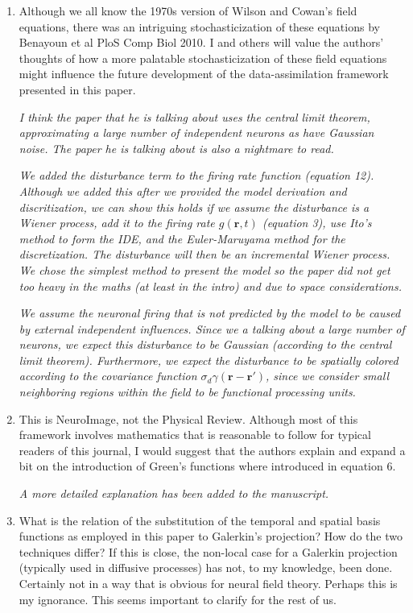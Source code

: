 \documentclass{article}
\begin{document}
\begin{enumerate}
\item Although we all know the 1970s version of Wilson and Cowan's field equations, there was an intriguing stochasticization of these equations by Benayoun et al PloS Comp Biol 2010. I and others will value the authors' thoughts of how a more palatable stochasticization of these field equations might influence the future development of the data-assimilation framework presented in this paper.

\emph{I think the paper that he is talking about uses the central limit theorem, approximating a large number of independent neurons as have Gaussian noise. The paper he is talking about is also a nightmare to read.}

\emph{We added the disturbance term to the firing rate function (equation 12). Although we added this after we provided the model derivation and discritization, we can show this holds if we assume the disturbance is a Wiener process, add it to the firing rate $g(\mathbf{r},t)$ (equation 3), use Ito's method to form the IDE, and the Euler-Maruyama method for the discretization. The disturbance will then be an incremental Wiener process. We chose the simplest method to present the model so the paper did not get too heavy in the maths (at least in the intro) and due to space considerations. }

\emph{We assume the neuronal firing that is not predicted by the model to be caused by external independent influences. Since we a talking about a large number of neurons, we expect this disturbance to be Gaussian (according to the central limit theorem). Furthermore, we expect the disturbance to be spatially colored according to the covariance function $\sigma_d\gamma(\mathbf{r}-\mathbf{r}')$, since we consider small neighboring regions within the field to be functional processing units.}

\item This is NeuroImage, not the Physical Review. Although most of this framework involves mathematics that is reasonable to follow for typical readers of this journal, I would suggest that the authors explain and expand a bit on the introduction of Green's functions where introduced in equation 6.

\emph{A more detailed explanation has been added to the manuscript.}

\item What is the relation of the substitution of the temporal and spatial basis functions as employed in this paper to Galerkin's projection? How do the two techniques differ? If this is close, the non-local case for a Galerkin projection (typically used in diffusive processes) has not, to my knowledge, been done. Certainly not in a way that is obvious for neural field theory. Perhaps this is my ignorance. This seems important to clarify for the rest of us.


\end{enumerate}
\end{document}
